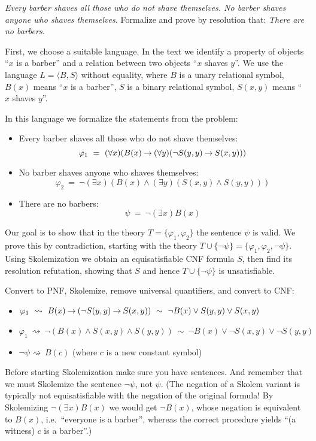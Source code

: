 \begin{problem} 
    
    \emph{Every barber shaves all those who do not shave themselves. No barber shaves anyone who shaves themselves.} Formalize and prove by resolution that: \emph{There are no barbers.}

    \begin{solution}

        First, we choose a suitable language. In the text we identify a property of objects ``$x$ is a barber'' and a relation between two objects ``$x$ shaves $y$''. We use the language $L=\langle B, S\rangle$ without equality, where $B$ is a unary relational symbol, $B(x)$ means ``$x$ is a barber'', $S$ is a binary relational symbol, $S(x,y)$ means ``$x$ shaves $y$''. 
        
        In this language we formalize the statements from the problem:
        \begin{itemize}
            \item Every barber shaves all those who do not shave themselves: 
            $$
            \varphi_1\ =\ (\forall x)(B(x)\mathbin{\rightarrow} (\forall y)(\neg S(y,y)\mathbin{\rightarrow} S(x,y)))
            $$
            \item No barber shaves anyone who shaves themselves: 
            $$
            \varphi_2\ =\ \neg (\exists x)(B(x) \land (\exists y)(S(x,y)\land S(y,y)))
            $$
            \item There are no barbers:
            $$
            \psi\ =\ \neg (\exists x)B(x)
            $$
        \end{itemize}
        Our goal is to show that in the theory $T=\{\varphi_1,\varphi_2\}$ the sentence $\psi$ is valid. We prove this by contradiction, starting with the theory $T\cup\{\neg\psi\}=\{\varphi_1,\varphi_2,\neg\psi\}$. Using Skolemization we obtain an equisatisfiable CNF formula $S$, then find its resolution refutation, showing that $S$ and hence $T\cup\{\neg\psi\}$ is unsatisfiable.

        Convert to PNF, Skolemize, remove universal quantifiers, and convert to CNF:
        \begin{itemize}
            \item $\varphi_1\ \rightsquigarrow\ B(x)\limplies (\neg S(y,y)\limplies S(x,y))\ \sim \ \neg B(x)\lor S(y,y)\lor S(x,y)$
            \item $\varphi_1\ \rightsquigarrow\ \neg(B(x)\land S(x,y)\land S(y,y))\ \sim\ \neg B(x)\lor \neg S(x,y)\lor \neg S(y,y)$
            \item $\neg\psi\rightsquigarrow\ B(c)$ (where $c$ is a new constant symbol)
        \end{itemize}
        Before starting Skolemization make sure you have sentences. And remember that we must Skolemize the sentence $\neg\psi$, not $\psi$. (The negation of a Skolem variant is typically not equisatisfiable with the negation of the original formula! By Skolemizing $\neg(\exists x)B(x)$ we would get $\neg B(x)$, whose negation is equivalent to $B(x)$, i.e.\ ``everyone is a barber'', whereas the correct procedure yields ``(a witness) $c$ is a barber''.)



\end{solution}
\end{problem}
